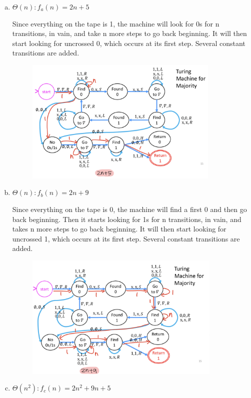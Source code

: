 \documentclass[11pt]{article}
\begin{document}
\begin{enumerate}[a.]
\item $\Theta(n): f_{a}(n) = 2n + 5$ 

Since everything on the tape is 1, the machine will look for 0s for n transitions, in vain, and take n more steps to go back beginning. It will then start looking for uncrossed 0, which occurs at its first step. Several constant transitions are added. 
\begin{figure}[ht!]
  \centering
  \includegraphics[origin=c, height=60mm]{1.jpeg}
\end{figure}

\item $\Theta(n): f_{b}(n) = 2n + 9$

Since everything on the tape is 0, the machine will find a first 0 and then go back beginning. Then it starts looking for 1s for n transitions, in vain, and takes n more steps to go back beginning. It will then start looking for uncrossed 1, which occurs at its first step. Several constant transitions are added. 
\begin{figure}[ht!]
  \centering
  \includegraphics[origin=c, height=60mm]{2.jpeg}
\end{figure}

\item $\Theta(n^2): f_{c}(n) = 2n^2 + 9n + 5$ 


\end{enumerate}
\end{document}
